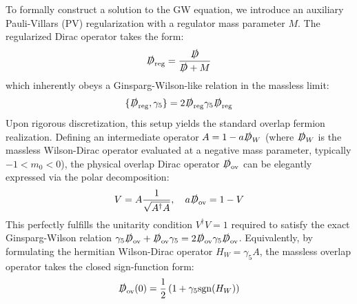 To formally construct a solution to the GW equation, we introduce an auxiliary Pauli-Villars (PV) regularization with a regulator mass parameter $M$. The regularized Dirac operator takes the form:
\begin{equation}
\slashed{D}_{\mathrm{reg}} = \frac{\slashed{D}}{\slashed{D} + M}
\label{eq:D_reg_PV}
\end{equation}
which inherently obeys a Ginsparg-Wilson-like relation in the massless limit:
\begin{equation}
\{\slashed{D}_{\mathrm{reg}}, \gamma_5\} = 2 \slashed{D}_{\mathrm{reg}} \gamma_5 \slashed{D}_{\mathrm{reg}}
\label{eq:GW_PV}
\end{equation}
Upon rigorous discretization, this setup yields the standard overlap fermion realization. Defining an intermediate operator $A = 1 - a \slashed{D}_W$ (where $\slashed{D}_W$ is the massless Wilson-Dirac operator evaluated at a negative mass parameter, typically $-1 < m_0 < 0$), the physical overlap Dirac operator $\slashed{D}_{\mathrm{ov}}$ can be elegantly expressed via the polar decomposition:
\begin{equation}
V = A \frac{1}{\sqrt{A^\dagger A}}, \quad a \slashed{D}_{\mathrm{ov}} = 1 - V
\label{eq:overlap_operator_A}
\end{equation}
This perfectly fulfills the unitarity condition $V^\dagger V = 1$ required to satisfy the exact Ginsparg-Wilson relation $\gamma_5 \slashed{D}_{\mathrm{ov}} + \slashed{D}_{\mathrm{ov}} \gamma_5 = 2 \slashed{D}_{\mathrm{ov}} \gamma_5 \slashed{D}_{\mathrm{ov}}$. Equivalently, by formulating the hermitian Wilson-Dirac operator $H_W = \gamma_5 A$, the massless overlap operator takes the closed sign-function form:
\begin{equation}
\slashed{D}_{\mathrm{ov}}(0) = \frac{1}{2} \left( 1 + \gamma_5 \mathrm{sgn}(H_W) \right)
\label{eq:overlap_operator_sgn}
\end{equation}

